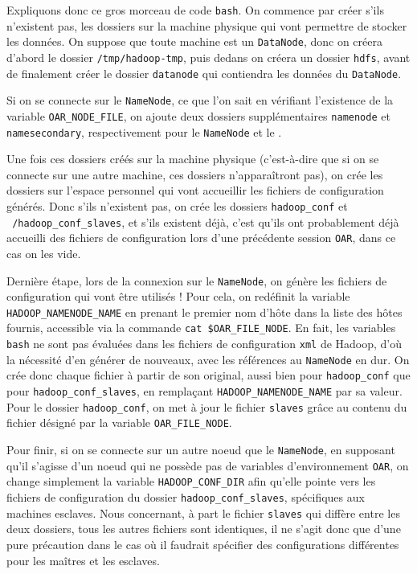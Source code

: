 \par Expliquons donc ce gros morceau de code \texttt{bash}. On commence par créer s'ils n'existent pas, les dossiers sur la machine physique qui vont permettre de stocker les données. On suppose que toute machine est un \texttt{DataNode}, donc on créera d'abord le dossier \texttt{/tmp/hadoop-tmp}, puis dedans on créera un dossier \texttt{hdfs}, avant de finalement créer le dossier \texttt{datanode} qui contiendra les données du \texttt{DataNode}.
\par Si on se connecte sur le \texttt{NameNode}, ce que l'on sait en vérifiant l'existence de la variable \texttt{OAR\_NODE\_FILE}, on ajoute deux dossiers supplémentaires \texttt{namenode} et \texttt{namesecondary}, respectivement pour le \texttt{NameNode} et le .
\par Une fois ces dossiers créés sur la machine physique (c'est-à-dire que si on se connecte sur une autre machine, ces dossiers n'apparaîtront pas), on crée les dossiers sur l'espace personnel qui vont accueillir les fichiers de configuration générés. Donc s'ils n'existent pas, on crée les dossiers \texttt{hadoop\_conf} et \texttt{~/hadoop\_conf\_slaves}, et s'ils existent déjà, c'est qu'ils ont probablement déjà accueilli des fichiers de configuration lors d'une précédente session \texttt{OAR}, dans ce cas on les vide.
\par Dernière étape, lors de la connexion sur le \texttt{NameNode}, on génère les fichiers de configuration qui vont être utilisés !
Pour cela, on redéfinit la variable \texttt{HADOOP\_NAMENODE\_NAME} en prenant le premier nom d'hôte dans la liste des hôtes fournis, accessible via la commande \texttt{cat \$OAR\_FILE\_NODE}. En fait, les variables \texttt{bash} ne sont pas évaluées dans les fichiers de configuration \texttt{xml} de Hadoop, d'où la nécessité d'en générer de nouveaux, avec les références au \texttt{NameNode} en dur. On crée donc chaque fichier à partir de son original, aussi bien pour \texttt{hadoop\_conf} que pour \texttt{hadoop\_conf\_slaves}, en remplaçant \texttt{HADOOP\_NAMENODE\_NAME} par sa valeur. Pour le dossier \texttt{hadoop\_conf}, on met à jour le fichier \texttt{slaves} grâce au contenu du fichier désigné par la variable \texttt{OAR\_FILE\_NODE}.

\par Pour finir, si on se connecte sur un autre noeud que le \texttt{NameNode}, en supposant qu'il s'agisse d'un noeud qui ne possède pas de variables d'environnement \texttt{OAR}, on change simplement la variable \texttt{HADOOP\_CONF\_DIR} afin qu'elle pointe vers les fichiers de configuration du dossier \texttt{hadoop\_conf\_slaves}, spécifiques aux machines esclaves. Nous concernant, à part le fichier \texttt{slaves} qui diffère entre les deux dossiers, tous les autres fichiers sont identiques, il ne s'agit donc que d'une pure précaution dans le cas où il faudrait spécifier des configurations différentes pour les maîtres et les esclaves.


